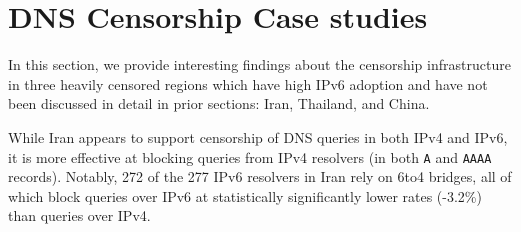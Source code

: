 \section{DNS Censorship Case studies}
\label{sec:cases}
In this section, we provide interesting findings about the censorship
infrastructure in three heavily censored regions which have high IPv6 adoption
and have not been discussed in detail in prior sections: Iran, Thailand, and
China.

% 

\IranRecursionTable

While Iran appears to support censorship of DNS queries in both IPv4 and IPv6,
it is more effective at blocking queries from IPv4 resolvers (in both \texttt{A}
and \texttt{AAAA} records). Notably, 272 of the 277 IPv6 resolvers in Iran rely
on 6to4 bridges, all of which block queries over IPv6 at statistically
significantly lower rates (-3.2\%) than queries over IPv4.

